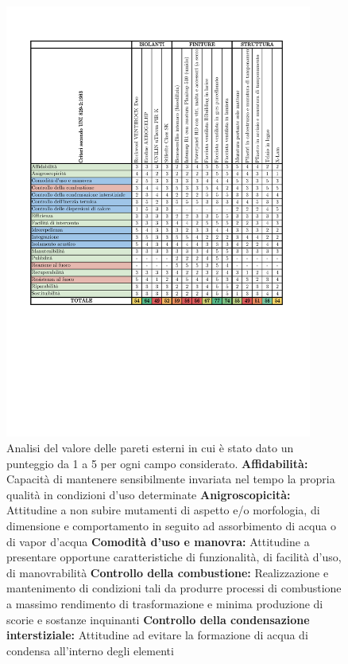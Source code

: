 \begin{figure}[p]
    \centering 
    \includegraphics[width=0.9\textwidth]{img/AnalisiValore.pdf}
    \caption[Analisi del valore delle pareti esterne]{%
\scriptsize
Analisi del valore delle pareti esterni in cui è stato dato un punteggio da 1 a 5 per ogni campo considerato.
\textbf{Affidabilità:} Capacità di mantenere sensibilmente invariata nel tempo la propria qualità in condizioni d'uso determinate
\textbf{Anigroscopicità:} Attitudine a non subire mutamenti di aspetto e/o morfologia, di dimensione e comportamento in seguito ad assorbimento di acqua o di vapor d'acqua
\textbf{Comodità d'uso e manovra:} Attitudine a presentare opportune caratteristiche di funzionalità, di facilità d'uso, di manovrabilità
\textbf{Controllo della combustione:} Realizzazione e mantenimento di condizioni tali da produrre processi di combustione a massimo rendimento di trasformazione e minima produzione di scorie e sostanze inquinanti
\textbf{Controllo della condensazione interstiziale:} Attitudine ad evitare la formazione di acqua di condensa all'interno degli elementi
}
\end{figure}
